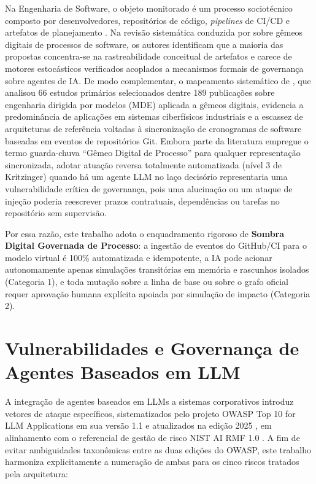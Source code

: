\documentclass[12pt,openany,oneside,a4paper,english,brazilian,sumario=tradicional]{abntex2}
\begin{document}
Na Engenharia de Software, o objeto monitorado é um processo sociotécnico composto por desenvolvedores, repositórios de código, \textit{pipelines} de CI/CD e artefatos de planejamento \cite{guinea2024,lehner2025}. Na revisão sistemática conduzida por  sobre gêmeos digitais de processos de software, os autores identificam que a maioria das propostas concentra-se na rastreabilidade conceitual de artefatos e carece de motores estocásticos verificados acoplados a mecanismos formais de governança sobre agentes de IA. De modo complementar, o mapeamento sistemático de , que analisou 66 estudos primários selecionados dentre 189 publicações sobre engenharia dirigida por modelos (MDE) aplicada a gêmeos digitais, evidencia a predominância de aplicações em sistemas ciberfísicos industriais e a escassez de arquiteturas de referência voltadas à sincronização de cronogramas de software baseadas em eventos de repositórios Git. Embora parte da literatura empregue o termo guarda-chuva ``Gêmeo Digital de Processo'' para qualquer representação sincronizada, adotar atuação reversa totalmente automatizada (nível 3 de Kritzinger) quando há um agente LLM no laço decisório representaria uma vulnerabilidade crítica de governança, pois uma alucinação ou um ataque de injeção poderia reescrever prazos contratuais, dependências ou tarefas no repositório sem supervisão.

Por essa razão, este trabalho adota o enquadramento rigoroso de \textbf{Sombra Digital Governada de Processo}: a ingestão de eventos do GitHub/CI para o modelo virtual é 100\% automatizada e idempotente, a IA pode acionar autonomamente apenas simulações transitórias em memória e rascunhos isolados (Categoria 1), e toda mutação sobre a linha de base ou sobre o grafo oficial requer aprovação humana explícita apoiada por simulação de impacto (Categoria 2).

\section{Vulnerabilidades e Governança de Agentes Baseados em LLM}\label{sec:owasp}

A integração de agentes baseados em LLMs a sistemas corporativos introduz vetores de ataque específicos, sistematizados pelo projeto OWASP Top 10 for LLM Applications em sua versão 1.1 \cite{owasp2023} e atualizados na edição 2025 \cite{owasp2025}, em alinhamento com o referencial de gestão de risco NIST AI RMF 1.0 \cite{nist2023}. A fim de evitar ambiguidades taxonômicas entre as duas edições do OWASP, este trabalho harmoniza explicitamente a numeração de ambas para os cinco riscos tratados pela arquitetura:
\end{document}
